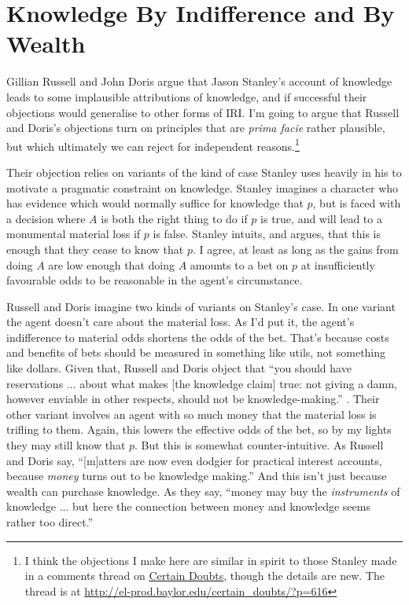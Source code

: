 \documentclass[oneside, a4paper]{book}
\begin{document}
\section{Knowledge By Indifference and By Wealth}

Gillian Russell and John Doris \citeyearpar{RussellDoris2008} argue that Jason Stanley's account of knowledge leads to some implausible attributions of knowledge, and if successful their objections would generalise to other forms of IRI. I'm going to argue that Russell and Doris's objections turn on principles that are \textit{prima facie} rather plausible, but which ultimately we can reject for independent reasons.\footnote{I think the objections I make here are similar in spirit to those Stanley made in a comments thread on \href{http://el-prod.baylor.edu/certain_doubts/?p=616}{Certain Doubts}, though the details are new. The thread is at \href{http://el-prod.baylor.edu/certain_doubts/?p=616}{http://el-prod.baylor.edu/certain\_doubts/?p=616}}

Their objection relies on variants of the kind of case Stanley uses heavily in his \citeyearpar{Stanley2005-STAKAP} to motivate a pragmatic constraint on knowledge. Stanley imagines a character who has evidence which would normally suffice for knowledge that \(p\), but is faced with a decision where \(A\) is both the right thing to do if \(p\) is true, and will lead to a monumental material loss if \(p\) is false. Stanley intuits, and argues, that this is enough that they cease to know that \(p\). I agree, at least as long as the gains from doing \(A\) are low enough that doing \(A\) amounts to a bet on \(p\) at insufficiently favourable odds to be reasonable in the agent's circumstance.

Russell and Doris imagine two kinds of variants on Stanley's case. In one variant the agent doesn't care about the material loss. As I'd put it, the agent's indifference to material odds shortens the odds of the bet. That's because costs and benefits of bets should be measured in something like utils, not something like dollars. Given that, Russell and Doris object that ``you should have reservations ... about what makes [the knowledge claim] true: not giving a damn, however enviable in other respects, should not be knowledge-making.'' \citep[432]{RussellDoris2008}. Their other variant involves an agent with so much money that the material loss is trifling to them. Again, this lowers the effective odds of the bet, so by my lights they may still know that \(p\). But this is somewhat counter-intuitive. As Russell and Doris say, ``[m]atters are now even dodgier for practical interest accounts, because \textit{money} turns out to be knowledge making.'' \citep[433]{RussellDoris2008} And this isn't just because wealth can purchase knowledge. As they say, ``money may buy the \textit{instruments} of knowledge ... but here the connection between money and knowledge seems rather too direct.'' \citep[433]{RussellDoris2008}
\end{document}
